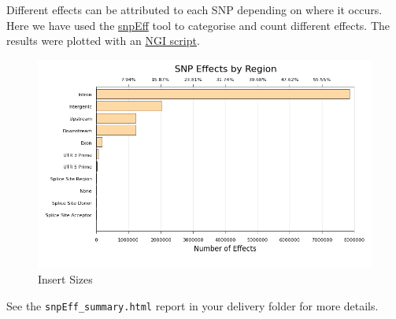 \documentclass[]{article}
\begin{document}
Different effects can be attributed to each SNP depending on where it
occurs. Here we have used the
\href{http://snpeff.sourceforge.net/}{snpEff} tool to categorise and
count different effects. The results were plotted with an
\href{https://github.com/SciLifeLab/visualizations}{NGI script}.

\begin{figure}[htbp]
\centering
\includegraphics{plots/snpEff_effect_regions.png}
\caption{Insert Sizes}
\end{figure}

See the \texttt{snpEff\_summary.html} report in your delivery folder for
more details.
\end{document}
